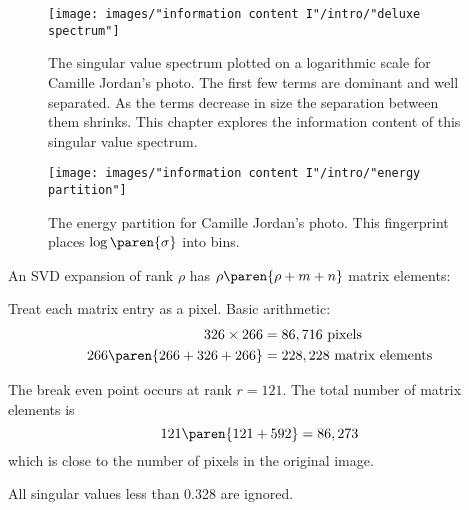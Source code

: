 
\begin{figure}[htbp] %
   \centering
   \texttt{[image: images/"information content I"/intro/"deluxe spectrum"]} 
   \caption[The singular value spectrum for Camille's photo]{The singular value spectrum plotted on a logarithmic scale for Camille Jordan's photo. The first few terms are dominant and well separated. As the terms decrease in size the separation between them shrinks. This chapter explores the information content of this singular value spectrum.}
   \label{fig:camille:spectrum}
\end{figure}

\begin{figure}[htbp] %
   \centering
   \texttt{[image: images/"information content I"/intro/"energy partition"]} 
   \caption[The energy partition for Camille's photo]{The energy partition for Camille Jordan's photo. This fingerprint places $\log\paren{\sigma}$ into bins.}
   \label{fig:camille:spectrum}
\end{figure}

An SVD expansion of rank $\rho$ has $\rho \paren{\rho + m + n} $ matrix elements:

Treat each matrix entry as a pixel. 
Basic arithmetic: 
\begin{equation}
  \begin{split}
    326 \times 266 &= 86,716 \text{ pixels} \\
    266 \paren{266 + 326 + 266} &= 228,228 \text{ matrix elements}
  \end{split}
\end{equation}

The break even point  occurs at rank $r=121$. The total number of matrix elements is
\begin{equation}
  121\paren{121 + 592} = 86,273
\end{equation}
which is close to the number of pixels in the original image.

All singular values less than 0.328 are ignored.

